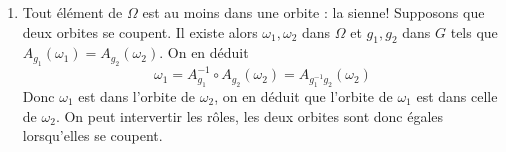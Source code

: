 \begin{enumerate}
 \item Tout élément de $\Omega$ est au moins dans une orbite : la sienne! Supposons que deux orbites se coupent. Il existe alors $\omega_1, \omega_2$ dans $\Omega$ et $g_1, g_2$ dans $G$ tels que $A_{g_1}(\omega_1)=A_{g_2}(\omega_2)$. On en déduit
\begin{displaymath}
 \omega_1 = A_{g_1}^{-1}\circ A_{g_2}(\omega_2)= A_{g_1^{-1}g_2}(\omega_2)
\end{displaymath}
Donc $\omega_1$ est dans l'orbite de $\omega_2$, on en déduit que l'orbite de $\omega_1$ est dans celle de $\omega_2$. On peut intervertir les rôles, les deux orbites sont donc égales lorsqu'elles se coupent. 
\end{enumerate}
 